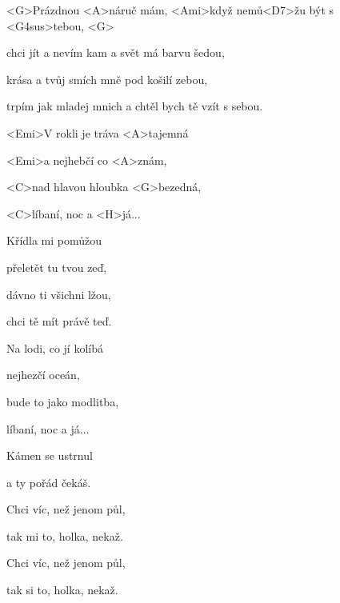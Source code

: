 

\zs
<G>Prázdnou <A>náruč mám, <Ami>když nemů<D7>žu být s <G4sus>tebou, <G>

chci jít a nevím kam a svět má barvu šedou,

krása a tvůj smích mně pod košilí zebou,

trpím jak mladej mnich a chtěl bych tě vzít s sebou.
\ks

\zr
<Emi>V rokli je tráva <A>tajemná

<Emi>a nejhebčí co <A>znám,

<C>nad hlavou hloubka <G>bezedná,

<C>líbaní, noc a <H>já...
\kr

\zs
Křídla mi pomůžou

přeletět tu tvou zeď,

dávno ti všichni lžou,

chci tě mít právě teď.

\ks

\zr
Na lodi, co jí kolíbá

nejhezčí oceán,

bude to jako modlitba,

líbaní, noc a já...
\kr

\zs
Kámen se ustrnul

a ty pořád čekáš.

Chci víc, než jenom půl,

tak mi to, holka, nekaž.

Chci víc, než jenom půl,

tak si to, holka, nekaž.

\ks

\kp
